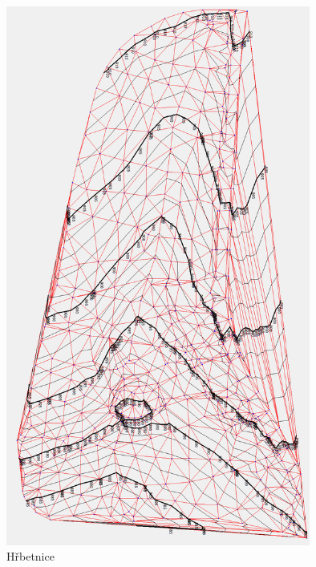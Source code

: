 \documentclass[a4paper, 12pt]{article}
\begin{document}
\begin{figure}[h]
	\centering
	\includegraphics[width=10cm]{DMT_vrstevnice.jpg}
	\caption{Hřbetnice}
\end{figure}
\end{document}
